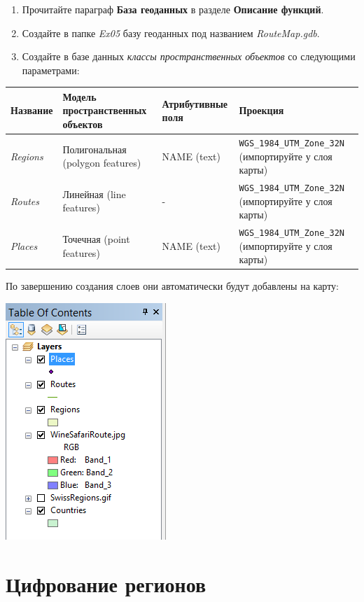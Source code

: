 \documentclass[]{book}
\theoremstyle{definition}
\theoremstyle{definition}
\theoremstyle{definition}
\theoremstyle{remark}
\begin{document}
\begin{enumerate}
\def\labelenumi{\arabic{enumi}.}
\item
  Прочитайте параграф \textbf{База геоданных} в разделе \textbf{Описание
  функций}.
\item
  Создайте в папке \emph{Ex05} базу геоданных под названием
  \emph{RouteMap.gdb}.
\item
  Создайте в базе данных \emph{классы пространственных объектов} со
  следующими параметрами:
\end{enumerate}

\begin{longtable}[]{@{}llll@{}}
\toprule
Название & Модель пространственных объектов & Атрибутивные поля &
Проекция\tabularnewline
\midrule
\endhead
\emph{Regions} & Полигональная (polygon features) & NAME (text) &
\texttt{WGS\_1984\_UTM\_Zone\_32N} (импортируйте у слоя
карты)\tabularnewline
\emph{Routes} & Линейная (line features) & - &
\texttt{WGS\_1984\_UTM\_Zone\_32N} (импортируйте у слоя
карты)\tabularnewline
\emph{Places} & Точечная (point features) & NAME (text) &
\texttt{WGS\_1984\_UTM\_Zone\_32N} (импортируйте у слоя
карты)\tabularnewline
\bottomrule
\end{longtable}

По завершению создания слоев они автоматически будут добавлены на карту:

\includegraphics{images/Ex05/image14.png}

\hypertarget{map-ref-general-digitizing}{%
\section{Цифрование регионов}\label{map-ref-general-digitizing}}
\end{document}
